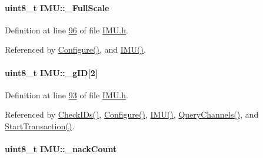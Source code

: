 \hypertarget{class_i_m_u_a059c02011a10bb90aecc9692ed345771}{
\paragraph[{\_\-FullScale}]{\setlength{\rightskip}{0pt plus 5cm}uint8\_\-t {\bf IMU::\_\-FullScale}}\hfill}
\label{class_i_m_u_a059c02011a10bb90aecc9692ed345771}


Definition at line \hyperlink{_i_m_u_8h_source_l00096}{96} of file \hyperlink{_i_m_u_8h_source}{IMU.h}.



Referenced by \hyperlink{_i_m_u_8cpp_source_l00803}{Configure()}, and \hyperlink{_i_m_u_8cpp_source_l00020}{IMU()}.

\hypertarget{class_i_m_u_a47ffe20a032e3a890cd3891793a60a40}{
\paragraph[{\_\-gID}]{\setlength{\rightskip}{0pt plus 5cm}uint8\_\-t {\bf IMU::\_\-gID}\mbox{[}2\mbox{]}}\hfill}
\label{class_i_m_u_a47ffe20a032e3a890cd3891793a60a40}


Definition at line \hyperlink{_i_m_u_8h_source_l00093}{93} of file \hyperlink{_i_m_u_8h_source}{IMU.h}.



Referenced by \hyperlink{_i_m_u_8cpp_source_l00651}{CheckIDs()}, \hyperlink{_i_m_u_8cpp_source_l00803}{Configure()}, \hyperlink{_i_m_u_8cpp_source_l00020}{IMU()}, \hyperlink{_i_m_u_8cpp_source_l00120}{QueryChannels()}, and \hyperlink{_i_m_u_8cpp_source_l00323}{StartTransaction()}.

\hypertarget{class_i_m_u_a30c8553ab21b5d6e618c2616f25dafb1}{
\paragraph[{\_\-nackCount}]{\setlength{\rightskip}{0pt plus 5cm}uint8\_\-t {\bf IMU::\_\-nackCount}}\hfill}
\label{class_i_m_u_a30c8553ab21b5d6e618c2616f25dafb1}


